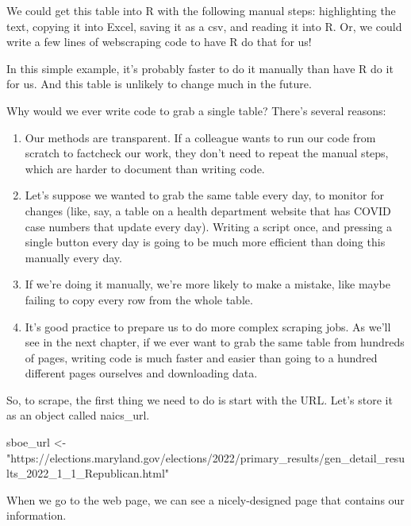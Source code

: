 \documentclass[
  letterpaper,
  DIV=11,
  numbers=noendperiod]{scrreprt}
\newenvironment{Shaded}{\begin{snugshade}}{\end{snugshade}}
\newcommand{\NormalTok}[1]{\textcolor[rgb]{0.00,0.23,0.31}{#1}}
\newcommand{\OtherTok}[1]{\textcolor[rgb]{0.00,0.23,0.31}{#1}}
\newcommand{\StringTok}[1]{\textcolor[rgb]{0.13,0.47,0.30}{#1}}
\providecommand{\tightlist}{%
  \setlength{\itemsep}{0pt}\setlength{\parskip}{0pt}}\usepackage{longtable,booktabs,array}
\begin{document}
We could get this table into R with the following manual steps:
highlighting the text, copying it into Excel, saving it as a csv, and
reading it into R. Or, we could write a few lines of webscraping code to
have R do that for us!

In this simple example, it's probably faster to do it manually than have
R do it for us. And this table is unlikely to change much in the future.

Why would we ever write code to grab a single table? There's several
reasons:

\begin{enumerate}
\def\labelenumi{\arabic{enumi}.}
\tightlist
\item
  Our methods are transparent. If a colleague wants to run our code from
  scratch to factcheck our work, they don't need to repeat the manual
  steps, which are harder to document than writing code.
\item
  Let's suppose we wanted to grab the same table every day, to monitor
  for changes (like, say, a table on a health department website that
  has COVID case numbers that update every day). Writing a script once,
  and pressing a single button every day is going to be much more
  efficient than doing this manually every day.
\item
  If we're doing it manually, we're more likely to make a mistake, like
  maybe failing to copy every row from the whole table.
\item
  It's good practice to prepare us to do more complex scraping jobs. As
  we'll see in the next chapter, if we ever want to grab the same table
  from hundreds of pages, writing code is much faster and easier than
  going to a hundred different pages ourselves and downloading data.
\end{enumerate}

So, to scrape, the first thing we need to do is start with the URL.
Let's store it as an object called naics\_url.

\begin{Shaded}
\begin{Highlighting}[]
\NormalTok{sboe\_url }\OtherTok{\textless{}{-}} \StringTok{"https://elections.maryland.gov/elections/2022/primary\_results/gen\_detail\_results\_2022\_1\_1\_Republican.html"}
\end{Highlighting}
\end{Shaded}

When we go to the web page, we can see a nicely-designed page that
contains our information.
\end{document}

